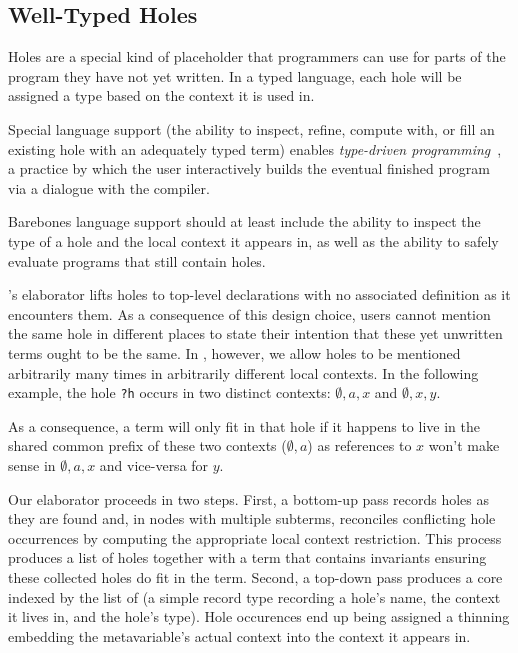\subsection{Well-Typed Holes}
\label{sec:design:holes}

Holes are a special kind of placeholder that programmers can use for parts of
the program they have not yet written.
%
In a typed language, each hole will be assigned a type based on the context it
is used in.

Special language support (the ability to inspect, refine, compute with,
or fill an existing hole with an adequately typed term)
enables \emph{type-driven programming}~\cite{DBLP:journals/pacmpl/OmarVCH19},
a practice by which the user interactively builds the eventual finished
program via a dialogue with the compiler.

Barebones language support should at least include the ability to inspect the
type of a hole and the local context it appears in, as well as the ability to
safely evaluate programs that still contain holes.



\Idris{}'s elaborator lifts holes to top-level declarations with no associated
definition as it encounters them.
%
As a consequence of this design choice, users cannot mention the same hole in
different places to state their intention that these yet unwritten terms ought
to be the same.
%
In \Velo{}, however, we allow holes to be mentioned arbitrarily many times in
arbitrarily different local contexts. In the following example, the hole
\texttt{?h} occurs in two distinct contexts: $\emptyset,a,x$ and $\emptyset,x,y$.

\begin{center}
  \holeexamplegraph{}
\end{center}

As a consequence, a term will only fit in that hole if it happens to live in the
shared common prefix of these two contexts ($\emptyset,a$) as references to $x$
won't make sense in $\emptyset,a,x$ and vice-versa for $y$.


Our elaborator proceeds in two steps.
%
First, a bottom-up pass records holes as they are found and, in nodes
with multiple subterms, reconciles conflicting hole occurrences by
computing the appropriate local context restriction.
%
This process produces a list of holes together with a 
term that contains invariants ensuring these collected holes do fit in the term.
%
Second, a top-down pass produces a core  indexed by the list
of  (a simple record type recording a hole's name, the context
it lives in, and the hole's type). Hole occurences end up being assigned a thinning
embedding the metavariable's actual context into the context it appears in.



